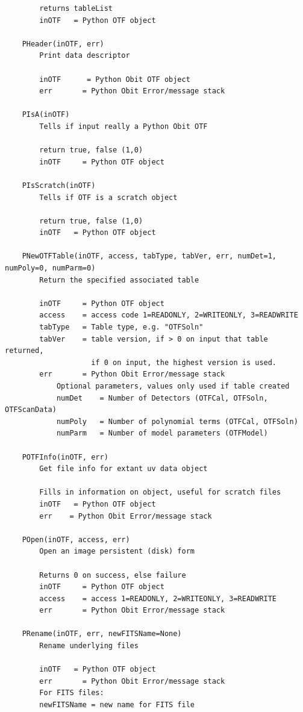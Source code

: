 \documentclass[11pt]{report}
\begin{document}
\begin{verbatim}
        returns tableList
        inOTF   = Python OTF object
    
    PHeader(inOTF, err)
        Print data descriptor
        
        inOTF      = Python Obit OTF object
        err       = Python Obit Error/message stack
    
    PIsA(inOTF)
        Tells if input really a Python Obit OTF
        
        return true, false (1,0)
        inOTF     = Python OTF object
    
    PIsScratch(inOTF)
        Tells if OTF is a scratch object
        
        return true, false (1,0)
        inOTF   = Python OTF object
    
    PNewOTFTable(inOTF, access, tabType, tabVer, err, numDet=1, numPoly=0, numParm=0)
        Return the specified associated table
        
        inOTF     = Python OTF object
        access    = access code 1=READONLY, 2=WRITEONLY, 3=READWRITE
        tabType   = Table type, e.g. "OTFSoln"
        tabVer    = table version, if > 0 on input that table returned,
                    if 0 on input, the highest version is used.
        err       = Python Obit Error/message stack
            Optional parameters, values only used if table created
            numDet    = Number of Detectors (OTFCal, OTFSoln, OTFScanData)
            numPoly   = Number of polynomial terms (OTFCal, OTFSoln)
            numParm   = Number of model parameters (OTFModel)
    
    POTFInfo(inOTF, err)
        Get file info for extant uv data object
        
        Fills in information on object, useful for scratch files
        inOTF   = Python OTF object
        err    = Python Obit Error/message stack
    
    POpen(inOTF, access, err)
        Open an image persistent (disk) form
        
        Returns 0 on success, else failure
        inOTF     = Python OTF object
        access    = access 1=READONLY, 2=WRITEONLY, 3=READWRITE
        err       = Python Obit Error/message stack
    
    PRename(inOTF, err, newFITSName=None)
        Rename underlying files
        
        inOTF   = Python OTF object
        err       = Python Obit Error/message stack
        For FITS files:
        newFITSName = new name for FITS file
    

\end{verbatim}
\end{document}
